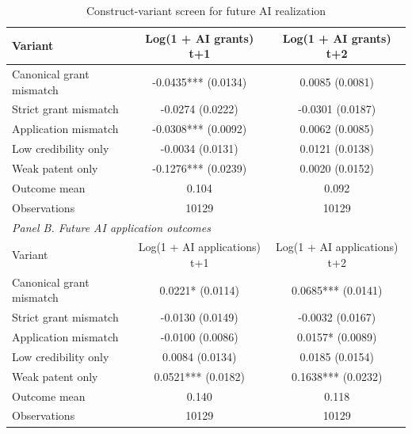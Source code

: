 \begin{table}[!htbp]
\centering
\caption{Construct-variant screen for future AI realization}
\begin{tabular}{lcc}
\hline
Variant & Log(1 + AI grants) t+1 & Log(1 + AI grants) t+2 \\
\hline
Canonical grant mismatch & -0.0435*** (0.0134) & 0.0085 (0.0081) \\
Strict grant mismatch & -0.0274 (0.0222) & -0.0301 (0.0187) \\
Application mismatch & -0.0308*** (0.0092) & 0.0062 (0.0085) \\
Low credibility only & -0.0034 (0.0131) & 0.0121 (0.0138) \\
Weak patent only & -0.1276*** (0.0239) & 0.0020 (0.0152) \\
Outcome mean & 0.104 & 0.092 \\
Observations & 10129 & 10129 \\
\hline
\multicolumn{3}{l}{\textit{Panel B. Future AI application outcomes}} \\
Variant & Log(1 + AI applications) t+1 & Log(1 + AI applications) t+2 \\
\hline
Canonical grant mismatch & 0.0221* (0.0114) & 0.0685*** (0.0141) \\
Strict grant mismatch & -0.0130 (0.0149) & -0.0032 (0.0167) \\
Application mismatch & -0.0100 (0.0086) & 0.0157* (0.0089) \\
Low credibility only & 0.0084 (0.0134) & 0.0185 (0.0154) \\
Weak patent only & 0.0521*** (0.0182) & 0.1638*** (0.0232) \\
Outcome mean & 0.140 & 0.118 \\
Observations & 10129 & 10129 \\
\hline
\end{tabular}
\end{table}
